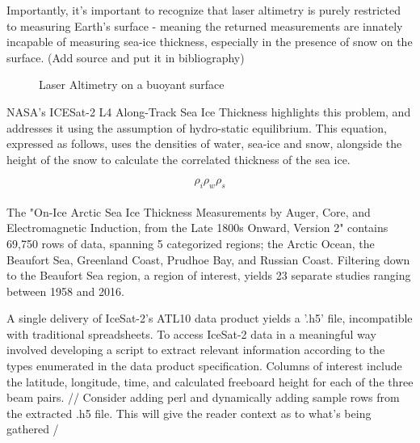 Importantly, it's important to recognize that laser altimetry is purely restricted to measuring Earth's surface - meaning the returned measurements are innately incapable of measuring sea-ice thickness, especially in the presence of snow on the surface. (Add source and put it in bibliography)
\begin{figure}[htb]
	\centering
	\caption{Laser Altimetry on a buoyant surface} \cite{ICESat-2-L4-Product}
	\label{fig:hydro-static-diagram}
\end{figure}

NASA's ICESat-2 L4 Along-Track Sea Ice Thickness highlights this problem, and addresses it using the assumption of hydro-static equilibrium. This equation, expressed as follows, uses the densities of water, sea-ice and snow, alongside the height of the snow to calculate the correlated thickness of the sea ice.

\begin{equation*}
	\rho_i
	\rho_w
	\rho_s
\end{equation*}


\paragraph*{}
The "On-Ice Arctic Sea Ice Thickness Measurements by Auger, Core, and Electromagnetic Induction, from the Late 1800s Onward, Version 2" contains 69,750 rows of data, spanning 5 categorized regions; the Arctic Ocean, the Beaufort Sea, Greenland Coast, Prudhoe Bay, and Russian Coast. Filtering down to the Beaufort Sea region, a region of interest, yields 23 separate studies ranging between 1958 and 2016.
\par


A single delivery of IceSat-2's ATL10 data product yields a '.h5' file, incompatible with traditional spreadsheets. To access IceSat-2 data in a meaningful way involved developing a script to extract relevant information according to the types enumerated in the data product specification. Columns of interest include the latitude, longitude, time, and calculated freeboard height for each of the three beam pairs.
// Consider adding perl and dynamically adding sample rows from the extracted .h5 file. This will give the reader context as to what's being gathered /

